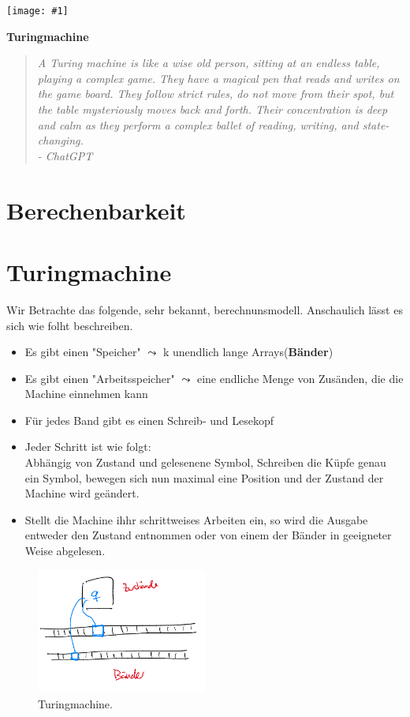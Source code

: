 \documentclass[a4paper,11pt]{article}
\newcommand{\coversection}[3]{
  \newpage
  \thispagestyle{empty}
  \begin{center}
    \vspace*{\fill}
    \texttt{[image: \#1]}
    \vspace*{0.5cm} %
    \par
    \Large\textbf{#2}
    \par\vspace{0.5cm} %
    \begin{quote}
      \itshape\small\raggedleft #3
    \end{quote}
    \par\vspace{\fill}
  \end{center}
  \newpage
}
\begin{document}
\tableofcontents
\coversection{turing.png}{Turingmachine}{A Turing machine is like a wise old person, sitting at an endless table, playing a complex game. They have a magical pen that reads and writes on the game board. They follow strict rules, do not move from their spot, but the table mysteriously moves back and forth. Their concentration is deep and calm as they perform a complex ballet of reading, writing, and state-changing.\\ \hspace*{\fill} - ChatGPT}
\section*{Berechenbarkeit}
\section{Turingmachine} 
\begin{sloppypar}
  Wir Betrachte das folgende, sehr bekannt, berechnunsmodell. Anschaulich lässt es sich wie folht beschreiben.
\end{sloppypar} 
\begin{itemize}
  \renewcommand\labelitemi{-}
  \item Es gibt einen "Speicher" $\leadsto $ k unendlich lange Arrays(\textbf{Bänder})
  \item Es gibt einen "Arbeitsspeicher" $\leadsto$ eine endliche Menge von Zusänden, die die Machine einnehmen kann
  \item Für jedes Band gibt es einen Schreib- und Lesekopf 
  \item Jeder Schritt ist wie folgt:\\ Abhängig von Zustand und gelesenene Symbol, Schreiben die Küpfe genau ein Symbol, bewegen sich nun maximal eine Position und der Zustand der Machine wird geändert.
  \item Stellt die Machine ihhr schrittweises Arbeiten ein, so wird die Ausgabe entweder den Zustand entnommen oder von einem der Bänder in geeigneter Weise abgelesen.
\end{itemize}

\begin{figure}[htp]
  \centering
  \includegraphics[width=0.5\textwidth]{turing_sym.png}
  \caption{Turingmachine.}
  \label{fig:tm}
\end{figure}
\end{document}
